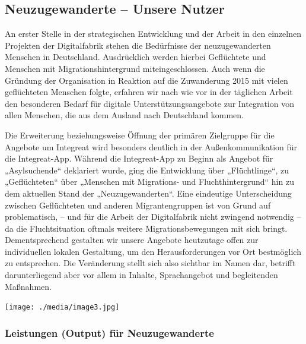 \documentclass[12pt, a4paper]{article} %
\begin{document}
\hypertarget{neuzugewanderte-unsere-nutzer}{%
\subsection{Neuzugewanderte – Unsere
Nutzer}\label{neuzugewanderte-unsere-nutzer}}

An erster Stelle in der strategischen Entwicklung und der Arbeit in den
einzelnen Projekten der Digitalfabrik stehen die Bedürfnisse der
neuzugewanderten Menschen in Deutschland. Ausdrücklich werden hierbei
Geflüchtete und Menschen mit Migrationshintergrund miteingeschlossen.
Auch wenn die Gründung der Organisation in Reaktion auf die Zuwanderung
2015 mit vielen geflüchteten Menschen folgte, erfahren wir nach wie vor
in der täglichen Arbeit den besonderen Bedarf für digitale
Unterstützungsangebote zur Integration von allen Menschen, die aus dem
Ausland nach Deutschland kommen.

Die Erweiterung beziehungsweise Öffnung der primären Zielgruppe für die
Angebote um Integreat wird besonders deutlich in der Außenkommunikation
für die Integreat-App. Während die Integreat-App zu Beginn als Angebot
für „Asylsuchende“ deklariert wurde, ging die Entwicklung über
„Flüchtlinge“, zu „Geflüchteten“ über „Menschen mit Migrations- und
Fluchthintergrund“ hin zu dem aktuellen Stand der „Neuzugewanderten“.
Eine eindeutige Unterscheidung zwischen Geflüchteten und anderen
Migrantengruppen ist von Grund auf problematisch, – und für die Arbeit
der Digitalfabrik nicht zwingend notwendig – da die Fluchtsituation
oftmals weitere Migrationsbewegungen mit sich bringt. Dementsprechend
gestalten wir unsere Angebote heutzutage offen zur individuellen lokalen
Gestaltung, um den Herausforderungen vor Ort bestmöglich zu entsprechen.
Die Veränderung stellt sich also sichtbar im Namen dar, betrifft
darunterliegend aber vor allem in Inhalte, Sprachangebot und begleitenden Maßnahmen.

\vspace{0.5cm}

\begin{minipage}[t]{\textwidth}
    \texttt{[image: ./media/image3.jpg]}
\end{minipage}

\hypertarget{leistungen-output-fuxfcr-neuzugewanderte}{%
\subsubsection{Leistungen (Output) für
Neuzugewanderte}\label{leistungen-output-fuxfcr-neuzugewanderte}}
\end{document}
